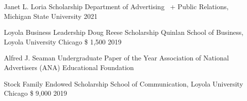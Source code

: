 
\begin{cvhonors}

  \cvhonor
    {Janet L. Loria Scholarship} %
    {Department of Advertising \ +  Public Relations, Michigan State University} %
    {} %
    {2021} %
\end{cvhonors}

\begin{cvhonors}

  \cvhonor
    {Loyola Business Leadership Doug Reese Scholarship} %
   {Quinlan School of Business, Loyola University Chicago
} %
    {\$ 1,500} %
    {2019} %

\cvhonor
    {Alfred J. Seaman Undergraduate Paper of the Year} %
    {Association of National Advertisers (ANA) Educational Foundation
} %
    {} %
    {} %
\end{cvhonors}

\begin{cvhonors}

  \cvhonor
    {Stock Family Endowed Scholarship} %
    {School of Communication, Loyola University Chicago} %
    {\$ 9,000} %
    {2019} %
\end{cvhonors}

